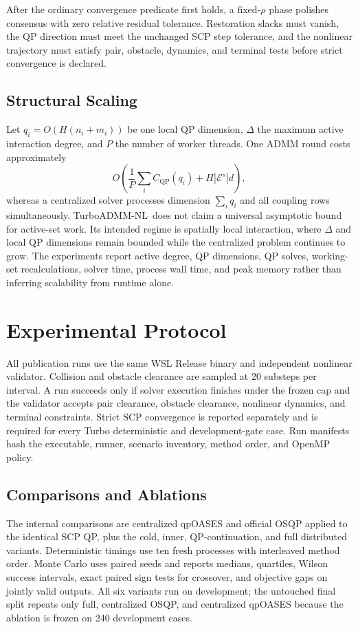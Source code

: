 \documentclass[letterpaper,10pt,conference]{ieeeconf}
\newcommand{\method}{TurboADMM-NL}
\begin{document}
After the ordinary convergence predicate first holds, a fixed-$\rho$ phase
polishes consensus with zero relative residual tolerance. Restoration slacks
must vanish, the QP direction must meet the unchanged SCP step tolerance, and
the nonlinear trajectory must satisfy pair, obstacle, dynamics, and terminal
tests before strict convergence is declared.

\subsection{Structural Scaling}
Let $q_i=O(H(n_i+m_i))$ be one local QP dimension, $\Delta$ the maximum active
interaction degree, and $P$ the number of worker threads. One ADMM round costs
approximately
\begin{equation}
 O\!\left(\frac{1}{P}\sum_i C_{\mathrm{QP}}(q_i)
 +H|\mathcal E^s|d\right),
\end{equation}
whereas a centralized solver processes dimension $\sum_iq_i$ and all coupling
rows simultaneously. \method\ does not claim a universal asymptotic bound for
active-set work. Its intended regime is spatially local interaction, where
$\Delta$ and local QP dimensions remain bounded while the centralized problem
continues to grow. The experiments report active degree, QP dimensions, QP
solves, working-set recalculations, solver time, process wall time, and peak
memory rather than inferring scalability from runtime alone.

\section{Experimental Protocol}
\label{sec:protocol}
All publication runs use the same WSL Release binary and independent nonlinear
validator. Collision and obstacle clearance are sampled at 20 substeps per
interval. A run succeeds only if solver execution finishes under the frozen
cap and the validator accepts pair clearance, obstacle clearance, nonlinear
dynamics, and terminal constraints. Strict SCP convergence is reported
separately and is required for every Turbo deterministic and development-gate
case. Run manifests hash the executable, runner, scenario inventory, method
order, and OpenMP policy.

\subsection{Comparisons and Ablations}
The internal comparisons are centralized qpOASES and official OSQP applied to
the identical SCP QP, plus the cold, inner, QP-continuation, and full
distributed variants. Deterministic timings use ten fresh processes with
interleaved method order. Monte Carlo uses paired seeds and reports medians,
quartiles, Wilson success intervals, exact paired sign tests for crossover,
and objective gaps on jointly valid outputs. All six variants run on
development; the untouched final split repeats only full, centralized OSQP,
and centralized qpOASES because the ablation is frozen on 240 development cases.
\end{document}

